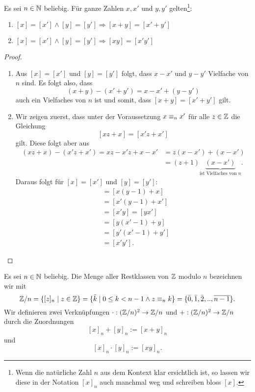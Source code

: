 \begin{rk}
Es sei $n\in\mathbb{N}$ beliebig. Für ganze Zahlen $x,x'$ und $y,y'$ gelten\footnote{Wenn die natürliche Zahl $n$ aus dem Kontext klar ersichtlich ist, so lassen wir diese in der Notation $[x]_n$ auch manchmal weg und schreiben bloss $[x]$.}:
\begin{enumerate}
 \item $[x]=[x']\land [y]=[y']\Rightarrow [x+y]=[x'+y']$
 \item $[x]=[x']\land [y]=[y']\Rightarrow [xy]=[x'y']$
\end{enumerate}
\end{rk}
\begin{proof}
 \begin{enumerate}
  \item Aus $[x]=[x']$ und $[y]=[y']$ folgt, dass $x-x'$ und $y-y'$ Vielfache von $n$ sind. Es folgt also, dass
\[
 (x+y)-(x'+y')=x-x'+(y-y')
\]
auch ein Vielfaches von $n$ ist und somit, dass $[x+y]=[x'+y']$ gilt.
\item Wir zeigen zuerst, dass unter der Voraussetzung $x\equiv_n x'$ für alle $z\in\mathbb{Z}$ die Gleichung
\[
 [xz+x]=[x'z+x']
\]
gilt. Diese folgt aber aus
\begin{align*}
 (xz+x)-(x'z+x')=xz-x'z+x-x'&=z(x-x')+(x-x')\\
&=(z+1)\underbrace{(x-x')}_{ \text{ist Vielfaches von }n}.
\end{align*}
Daraus folgt für $[x]=[x']$ und $[y]=[y']$:
\begin{align*}
[xy]&=[x(y-1)+x]\\
&=[x'(y-1)+x']\\
&=[x'y]=[yx']\\
&=[y(x'-1)+y]\\
&=[y'(x'-1)+y']\\
&=[x'y'].
\end{align*}
\end{enumerate}
\end{proof}

\begin{df}
 Es sei $n\in\mathbb{N}$ beliebig. Die Menge aller Restklassen von $\mathbb{Z}$ modulo $n$ bezeichnen wir mit
\[
\mathbb{Z}/n=\{[z]_n\mid z\in\mathbb{Z}\}=\{\bar k\mid 0\leq k<n-1\wedge z\equiv_n k\}=\{\bar 0,\bar1,\bar2,..,\overline{n-1}\}.
\]
Wir definieren zwei Verknüpfungen $\cdot:(\mathbb{Z}/n)^2\rightarrow \mathbb{Z}/n$ und $+:(\mathbb{Z}/n)^2\rightarrow \mathbb{Z}/n$ durch die Zuordnungen
\[
 [x]_n+[y]_n:=[x+y]_n
\]
und
\[
 [x]_n\cdot[y]_n:=[xy]_n.
\]
\end{df}


